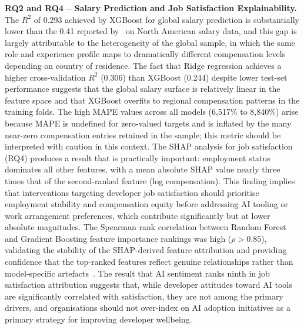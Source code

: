 \documentclass[journal, onecolumn]{IEEEtran}
\begin{document}
\textbf{RQ2 and RQ4 -- Salary Prediction and Job Satisfaction Explainability.}
The $R^2$ of 0.293 achieved by XGBoost for global salary prediction is substantially lower than the 0.41 reported by~\cite{huang2022predicting} on North American salary data, and this gap is largely attributable to the heterogeneity of the global sample, in which the same role and experience profile maps to dramatically different compensation levels depending on country of residence.
The fact that Ridge regression achieves a higher cross-validation $R^2$ (0.306) than XGBoost (0.244) despite lower test-set performance suggests that the global salary surface is relatively linear in the feature space and that XGBoost overfits to regional compensation patterns in the training folds.
The high MAPE values across all models (6,517\% to 8,840\%) arise because MAPE is undefined for zero-valued targets and is inflated by the many near-zero compensation entries retained in the sample; this metric should be interpreted with caution in this context.
The SHAP analysis for job satisfaction (RQ4) produces a result that is practically important: employment status dominates all other features, with a mean absolute SHAP value nearly three times that of the second-ranked feature (log compensation).
This finding implies that interventions targeting developer job satisfaction should prioritise employment stability and compensation equity before addressing AI tooling or work arrangement preferences, which contribute significantly but at lower absolute magnitudes.
The Spearman rank correlation between Random Forest and Gradient Boosting feature importance rankings was high ($\rho > 0.85$), validating the stability of the SHAP-derived feature attribution and providing confidence that the top-ranked features reflect genuine relationships rather than model-specific artefacts~\cite{lundberg2017unified}.
The result that AI sentiment ranks ninth in job satisfaction attribution suggests that, while developer attitudes toward AI tools are significantly correlated with satisfaction, they are not among the primary drivers, and organisations should not over-index on AI adoption initiatives as a primary strategy for improving developer wellbeing.
\end{document}
